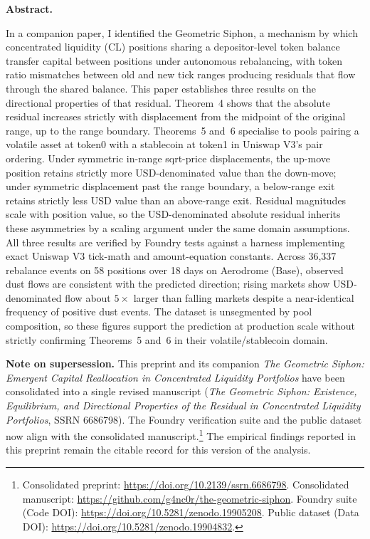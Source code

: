 \documentclass[11pt,a4paper]{article}
\renewenvironment{abstract}{%
  \fontsize{10pt}{13pt}\selectfont
  \begin{list}{}{%
    \setlength{\leftmargin}{0.5in}%
    \setlength{\rightmargin}{0.5in}%
    \setlength{\listparindent}{0pt}%
    \setlength{\parsep}{6pt plus 2pt minus 1pt}%
    \setlength{\topsep}{0pt}%
    \setlength{\partopsep}{0pt}%
  }\item[]\noindent\textbf{Abstract.}\hspace{0.5em}\ignorespaces
}{\end{list}}
\theoremstyle{definition}
\begin{document}
\begin{abstract}
In a companion paper\cite{ryan2026a}, I identified the Geometric Siphon, a mechanism by which concentrated liquidity (CL) positions sharing a depositor-level token balance transfer capital between positions under autonomous rebalancing, with token ratio mismatches between old and new tick ranges producing residuals that flow through the shared balance. This paper establishes three results on the directional properties of that residual. Theorem~4 shows that the absolute residual increases strictly with displacement from the midpoint of the original range, up to the range boundary. Theorems~5 and~6 specialise to pools pairing a volatile asset at token0 with a stablecoin at token1 in Uniswap V3's pair ordering. Under symmetric in-range sqrt-price displacements, the up-move position retains strictly more USD-denominated value than the down-move; under symmetric displacement past the range boundary, a below-range exit retains strictly less USD value than an above-range exit. Residual magnitudes scale with position value, so the USD-denominated absolute residual inherits these asymmetries by a scaling argument under the same domain assumptions. All three results are verified by Foundry tests against a harness implementing exact Uniswap V3 tick-math and amount-equation constants. Across 36{,}337 rebalance events on 58 positions over 18 days on Aerodrome (Base), observed dust flows are consistent with the predicted direction; rising markets show USD-denominated flow about $5\times$ larger than falling markets despite a near-identical frequency of positive dust events. The dataset is unsegmented by pool composition, so these figures support the prediction at production scale without strictly confirming Theorems~5 and~6 in their volatile/stablecoin domain.
\end{abstract}

\vspace{24pt}

\begin{list}{}{%
  \setlength{\leftmargin}{0.5in}%
  \setlength{\rightmargin}{0.5in}%
  \setlength{\listparindent}{0pt}%
  \setlength{\topsep}{0pt}%
  \setlength{\partopsep}{0pt}%
}\item[]\fontsize{10pt}{13pt}\selectfont\noindent\textbf{Note on supersession.} This preprint and its companion \emph{The Geometric Siphon: Emergent Capital Reallocation in Concentrated Liquidity Portfolios} have been consolidated into a single revised manuscript (\emph{The Geometric Siphon: Existence, Equilibrium, and Directional Properties of the Residual in Concentrated Liquidity Portfolios}, SSRN 6686798). The Foundry verification suite and the public dataset now align with the consolidated manuscript.\footnote{Consolidated preprint: \url{https://doi.org/10.2139/ssrn.6686798}. Consolidated manuscript: \url{https://github.com/g4nc0r/the-geometric-siphon}. Foundry suite (Code DOI): \url{https://doi.org/10.5281/zenodo.19905208}. Public dataset (Data DOI): \url{https://doi.org/10.5281/zenodo.19904832}.} The empirical findings reported in this preprint remain the citable record for this version of the analysis.\end{list}
\end{document}
